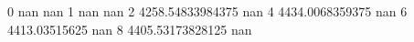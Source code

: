 0 nan nan
1 nan nan
2 4258.54833984375 nan
4 4434.0068359375 nan
6 4413.03515625 nan
8 4405.53173828125 nan
